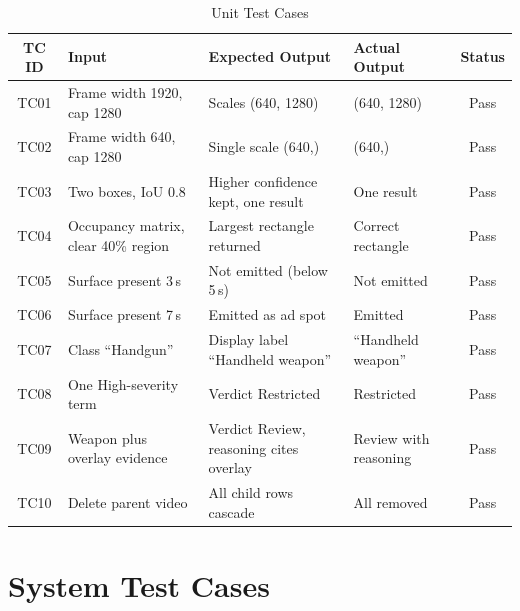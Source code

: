\documentclass[
12pt,
a4paper,
oneside
]{report}
\begin{document}
\begin{table}[H]
\centering
\small
\begin{tabular}{|c|p{3cm}|p{3.4cm}|p{3.4cm}|c|}
\hline
\textbf{TC ID} & \textbf{Input} & \textbf{Expected Output} &
\textbf{Actual Output} & \textbf{Status} \\
\hline
TC01 & Frame width 1920, cap 1280 & Scales (640, 1280) & (640, 1280) & Pass \\
\hline
TC02 & Frame width 640, cap 1280 & Single scale (640,) & (640,) & Pass \\
\hline
TC03 & Two boxes, IoU 0.8 & Higher confidence kept, one result & One result &
Pass \\
\hline
TC04 & Occupancy matrix, clear 40\% region & Largest rectangle returned &
Correct rectangle & Pass \\
\hline
TC05 & Surface present 3\,s & Not emitted (below 5\,s) & Not emitted & Pass \\
\hline
TC06 & Surface present 7\,s & Emitted as ad spot & Emitted & Pass \\
\hline
TC07 & Class ``Handgun'' & Display label ``Handheld weapon'' & ``Handheld
weapon'' & Pass \\
\hline
TC08 & One High-severity term & Verdict Restricted & Restricted & Pass \\
\hline
TC09 & Weapon plus overlay evidence & Verdict Review, reasoning cites overlay &
Review with reasoning & Pass \\
\hline
TC10 & Delete parent video & All child rows cascade & All removed & Pass \\
\hline
\end{tabular}
\caption{Unit Test Cases}
\end{table}

\section{System Test Cases}
\end{document}
